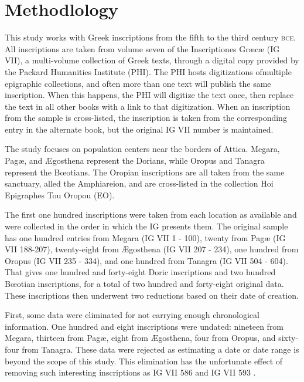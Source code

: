 \section{Methodlology}

This study works with Greek inscriptions from the fifth to the third century \textsc{bce}.
All inscriptions are taken from volume seven of the Inscriptiones Græcæ (IG VII),
a multi-volume collection of Greek texts,
through a digital copy provided by the Packard Humanities Institute (PHI).
The PHI hosts digitizations ofmultiple epigraphic collections,
and often more than one text will publish the same inscription.
When this happens, the PHI will digitize the text once,
then replace the text in all other books with a link to that digitization.
When an inscription from the sample is cross-listed,
the inscription is taken from the corresponding entry in the alternate book,
but the original IG VII number is maintained.

The study focuses on population centers near the borders of Attica.
Megara, Pagæ, and Ægosthena represent the Dorians,
while Oropus and Tanagra represent the Bœotians.
The Oropian inscriptions are all taken from the same sanctuary,
alled the Amphiareion, 
and are cross-listed in the collection Hoi Epigraphes Tou Oropou (EO).

The first one hundred inscriptions were taken from each location as available
and were collected in the order in which the IG presents them.
The original sample has one hundred entries from Megara (IG VII 1 - 100), 
twenty from Pagæ (IG VII 188-207), 
twenty-eight from Ægosthena (IG VII 207 - 234), 
one hundred from Oropus (IG VII 235 - 334), 
and one hundred from Tanagra (IG VII 504 - 604). 
That gives one hundred and forty-eight Doric inscriptions and two hundred Bœotian inscriptions,
 for a total of two hundred and forty-eight original data. 
 These inscriptions then underwent two reductions based on their date of creation.

First, some data were eliminated for not carrying enough chronological information. 
One hundred and eight inscriptions were undated: 
nineteen from Megara,
thirteen from Pagæ, 
eight from Ægosthena, 
four from Oropus, 
and sixty-four from Tanagra. 
These data were rejected as estimating a date or date range is beyond the scope of this study. 
This elimination has the unfortunate effect of removing such interesting inscriptions as IG VII 586 
and IG VII 593 .


